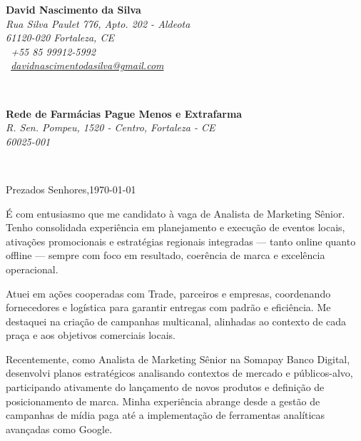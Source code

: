 \begin{commentA}
\sffamily   %
\hfill%
\begin{minipage}[t]{.6\textwidth}
	\raggedleft%
	{\bfseries David Nascimento da Silva}\\[.35ex]
	\small\itshape%
	Rua Silva Paulet 776, Apto. 202 - Aldeota\\
	61120-020 Fortaleza, CE\\[.35ex]
	\Telefone~+55 85 99912-5992\\
	\Letter~\href{mailto:davidnascimentodasilva@gmail.com}{davidnascimentodasilva@gmail.com}
\end{minipage}\\[1em]
%
\begin{minipage}[t]{.4\textwidth}
	\raggedright%
	{\bfseries Rede de Farmácias Pague Menos e Extrafarma}\\[.35ex]
	\small\itshape%
	R. Sen. Pompeu, 1520 - Centro, Fortaleza - CE\\
	60025-001
\end{minipage}
\hfill %
%
\begin{minipage}[t]{.4\textwidth}
\end{minipage}\\[2em]
\raggedright%
Prezados Senhores,\hfill \today\\[1.5em]

\setlength{\parskip}{1.0\baselineskip} %
\setlength{\parindent}{0pt} %

\vspace{1.5em} %
É com entusiasmo que me candidato à vaga de Analista de Marketing Sênior. Tenho consolidada experiência em planejamento e execução de eventos locais, ativações promocionais e estratégias regionais integradas — tanto online quanto offline — sempre com foco em resultado, coerência de marca e excelência operacional.

\noindent Atuei em ações cooperadas com Trade, parceiros e empresas, coordenando fornecedores e logística para garantir entregas com padrão e eficiência. Me destaquei na criação de campanhas multicanal, alinhadas ao contexto de cada praça e aos objetivos comerciais locais.

\noindent Recentemente, como Analista de Marketing Sênior na Somapay Banco Digital, desenvolvi planos estratégicos analisando contextos de mercado e públicos-alvo, participando ativamente do lançamento de novos produtos e definição de posicionamento de marca. Minha experiência abrange desde a gestão de campanhas de mídia paga até a implementação de ferramentas analíticas avançadas como Google.


\end{commentA}
